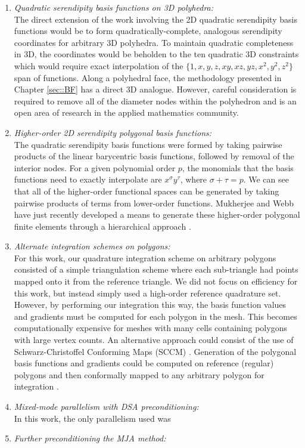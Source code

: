 \begin{enumerate}
\item {\em Quadratic serendipity basis functions on 3D polyhedra:} \\
The direct extension of the work involving the 2D quadratic serendipity basis functions would be to form quadratically-complete, analogous serendipity coordinates for arbitrary 3D polyhedra. To maintain quadratic completeness in 3D, the coordinates would be beholden to the ten quadratic 3D constraints which would require exact interpolation of the $\{ 1,x,y,z,xy,xz,yz,x^2,y^2,z^2 \}$ span of functions. Along a polyhedral face, the methodology presented in Chapter \ref{sec::BF} has a direct 3D analogue. However, careful consideration is required to remove all of the diameter nodes within the polyhedron and is an open area of research in the applied mathematics community.
\item {\em Higher-order 2D serendipity polygonal basis functions:} \\
The quadratic serendipity basis functions were formed by taking pairwise products of the linear barycentric basis functions, followed by removal of the interior nodes. For a given polynomial order $p$, the monomials that the basis functions need to exactly interpolate are $x^\sigma y^\tau$, where $\sigma + \tau = p$. We can see that all of the higher-order functional spaces can be generated by taking pairwise products of terms from lower-order functions. Mukherjee and Webb have just recently developed a means to generate these higher-order polygonal finite elements through a hierarchical approach \cite{mukherjee2015hierarchical}.
\item {\em Alternate integration schemes on polygons:} \\
For this work, our quadrature integration scheme on arbitrary polygons consisted of a simple triangulation scheme where each sub-triangle had points mapped onto it from the reference triangle. We did not focus on efficiency for this work, but instead simply used a high-order reference quadrature set. However, by performing our integration this way, the basis function values and gradients must be computed for each polygon in the mesh. This becomes computationally expensive for meshes with many cells containing polygons with large vertex counts. An alternative approach could consist of the use of Schwarz-Christoffel Conforming Maps (SCCM) \cite{driscoll2002schwarz,driscoll2005algorithm}. Generation of the polygonal basis functions and gradients could be computed on reference (regular) polygons and then conformally mapped to any arbitrary polygon for integration \cite{natarajan2009numerical}.
\item {\em Mixed-mode parallelism with DSA preconditioning:} \\
In this work, the only parallelism used was 
\item {\em Further preconditioning the MJA method:} \\

\end{enumerate}
